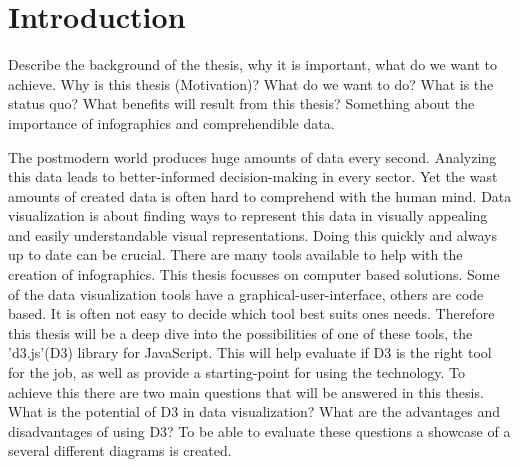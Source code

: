 \chapter{Introduction}
Describe the background of the thesis, why it is important, what do we want to achieve.
Why is this thesis (Motivation)? What do we want to do? What is the status quo? What benefits will result from this thesis?
Something about the importance of infographics and comprehendible data. 


The postmodern world produces huge amounts of data every second. Analyzing this data leads to better-informed decision-making in every sector. Yet the wast amounts of created data is often hard to comprehend with the human mind. Data visualization is about finding ways to represent this data in visually appealing and easily understandable visual representations. Doing this quickly and always up to date can be crucial. There are many tools available to help with the creation of infographics. This thesis focusses on computer based solutions. Some of the data visualization tools have a graphical-user-interface, others are code based. It is often not easy to decide which tool best suits ones needs. Therefore this thesis will be a deep dive into the possibilities of one of these tools, the 'd3.js'(D3) library for JavaScript. This will help evaluate if D3 is the right tool for the job, as well as provide a starting-point for using the technology. To achieve this there are two main questions that will be answered in this thesis. What is the potential of D3 in data visualization? What are the advantages and disadvantages of using D3? To be able to evaluate these questions a showcase of a several different diagrams is created.
